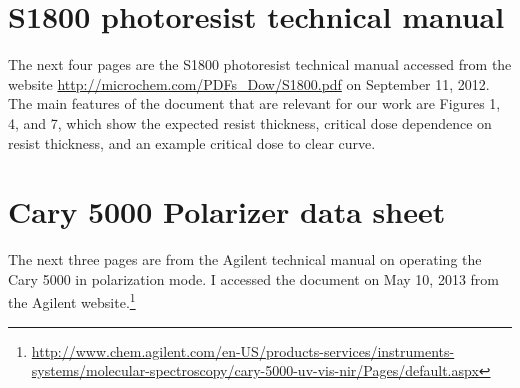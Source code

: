 \chapter{S1800 photoresist technical manual}
\label{sec:A1s1800}

The next four pages are the S1800 photoresist technical manual accessed from the website \url{http://microchem.com/PDFs_Dow/S1800.pdf} on September 11, 2012.  The main features of the document that are relevant for our work are Figures 1, 4, and 7, which show the expected resist thickness, critical dose dependence on resist thickness, and an example critical dose to clear curve.

 

\chapter{Cary 5000 Polarizer data sheet}
\label{sec:A2Cary5000Pol}

The next three pages are from the Agilent technical manual on operating the Cary 5000 in polarization mode.  I accessed the document on May 10, 2013 from the Agilent website.\footnote{\url{http://www.chem.agilent.com/en-US/products-services/instruments-systems/molecular-spectroscopy/cary-5000-uv-vis-nir/Pages/default.aspx}}

 

